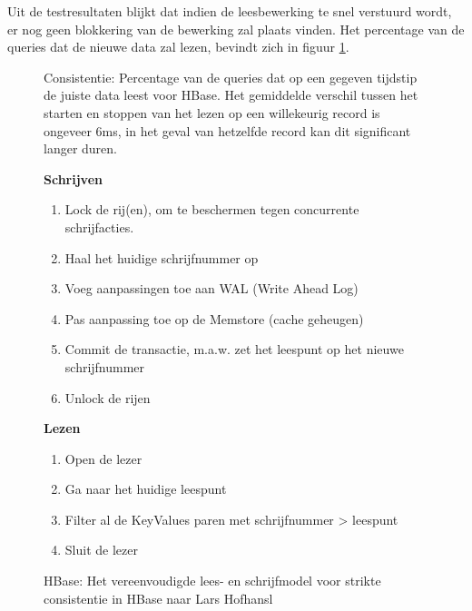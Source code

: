Uit de testresultaten blijkt dat indien de leesbewerking te snel verstuurd wordt, er nog geen blokkering van de bewerking zal plaats vinden. Het percentage van de queries dat de nieuwe data zal lezen, bevindt zich in figuur \ref{fig:consistentie-hbase-correct}.


\begin{figure}[!htf]

\caption{Consistentie: Percentage van de queries dat op een gegeven tijdstip de juiste data leest voor HBase. Het gemiddelde verschil tussen het starten en stoppen van het lezen op een willekeurig record is ongeveer 6ms, in het geval van hetzelfde record kan dit significant langer duren. }
\label{fig:consistentie-hbase-correct}
\end{figure}


\begin{figure}[tb!]
	\begin{minipage}{0.5\textwidth} 
	\textbf{Schrijven}
	\begin{enumerate}
	\item Lock de rij(en), om te beschermen tegen concurrente schrijfacties. 
	\item Haal het huidige schrijfnummer op
	\item Voeg aanpassingen toe aan WAL (Write Ahead Log)
	\item Pas aanpassing toe op de Memstore (cache geheugen)
	\item Commit de transactie, m.a.w. zet het leespunt op het nieuwe schrijfnummer
	\item Unlock de rijen
	\end{enumerate}
	\end{minipage} \hfill
	\begin{minipage}{0.3\textwidth} 
	\textbf{Lezen}
	\begin{enumerate}
	\item Open de lezer
	\item Ga naar het huidige leespunt
	\item Filter al de KeyValues paren met schrijfnummer > leespunt
	\item Sluit de lezer
	\end{enumerate}
	\end{minipage}
	\caption{HBase: Het vereenvoudigde lees- en schrijfmodel voor strikte consistentie in HBase naar Lars Hofhansl\cite{hbase-acid}}\label{fig:consistency-hbase-uitleg}
\end{figure}


